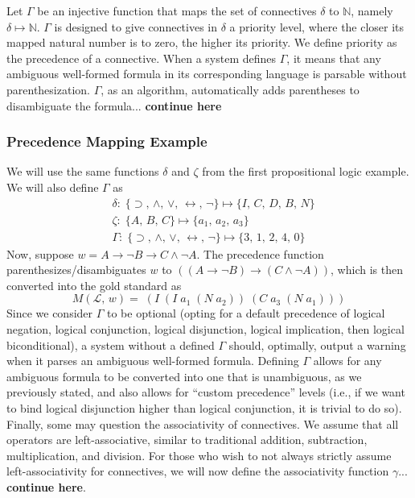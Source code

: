 \documentclass[ms]{uncgdissertationexp2}
\theoremstyle{plain}
\theoremstyle{definition}
\theoremstyle{remark}
\begin{document}
Let $\Gamma$ be an injective function that maps the set of connectives $\delta$ to $\mathbb{N}$, namely $\delta \mapsto \mathbb{N}$. $\Gamma$ is designed to give connectives in $\delta$ a priority level, where the closer its mapped natural number is to zero, the higher its priority. We define priority as the precedence of a connective. When a system defines $\Gamma$, it means that any ambiguous well-formed formula in its corresponding language is parsable without parenthesization. $\Gamma$, as an algorithm, automatically adds parentheses to disambiguate the formula... \textbf{continue here}

\subsubsection{Precedence Mapping Example} We will use the same functions $\delta$ and $\zeta$ from the first propositional logic example. We will also define $\Gamma$ as
\begin{align*}
	& \delta:\;\{\supset,\,\land,\,\lor,\,\leftrightarrow,\,\lnot\}\mapsto \{I,\,C,\,D,\,B,\,N\} \\
	& \zeta:\;\{A,\,B,\,C\} \mapsto \{a_{1},\,a_{2},\,a_{3}\} \\
	& \Gamma:\;\{\supset,\,\land,\,\lor,\,\leftrightarrow,\,\lnot\}\mapsto\{3,\,1,\,2,\,4,\,0\}                              
\end{align*}
Now, suppose $w = A \to \lnot B \to C \land \lnot A$. The precedence function parenthesizes/disambiguates $w$ to $((A \to \lnot B) \to (C \land \lnot A))$, which is then converted into the gold standard as
\[	
	M(\mathcal{L},\,w) =\;(I\;(I\;a_{1}\;(N\;a_{2}))\;(C\;a_{3}\;(N\;a_{1})))
\]
Since we consider $\Gamma$ to be optional (opting for a default precedence of logical negation, logical conjunction, logical disjunction, logical implication, then logical biconditional), a system without a defined $\Gamma$ should, optimally, output a warning when it parses an ambiguous well-formed formula. Defining $\Gamma$ allows for any ambiguous formula to be converted into one that is unambiguous, as we previously stated, and also allows for ``custom precedence'' levels (i.e., if we want to bind logical disjunction higher than logical conjunction, it is trivial to do so). Finally, some may question the associativity of connectives. We assume that all operators are left-associative, similar to traditional addition, subtraction, multiplication, and division. For those who wish to not always strictly assume left-associativity for connectives, we will now define the associativity function $\gamma$... \textbf{continue here}.
\end{document}
